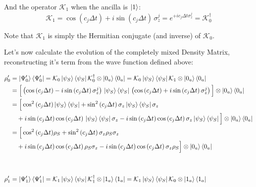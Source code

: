 \documentclass[a4paper,12pt]{article}
\begin{document}
	And the operator $\mathcal{K}_1$ when the ancilla is $\ket{1}$:
	\begin{equation}
		\mathcal{K}_1 = \cos{\left( c_j \Delta t \right)} + i \sin{\left( c_j \Delta t \right)} \, \sigma_{z}^{j} = e^{+i c_j \Delta t \sigma_z^j} = \mathcal{K}_0^\dagger
		\label{eq:k1_def}
	\end{equation}

	Note that $\mathcal{K}_1$ is simply the Hermitian conjugate (and inverse) of $\mathcal{K}_0$.

	\begin{flushleft}
		Let's now calculate the evolution of the completely mixed Density Matrix, reconstructing it's term from the wave function defined above:
	\end{flushleft}
	\begin{align}
		\rho'_{0} &= \ket{\Psi'_{0}}\bra{\Psi'_{0}} = \mathcal{K}_{0} \ket{\psi_S}\bra{\psi_S} \mathcal{K}_{0}^{\dagger} \otimes \ket{0_a}\bra{0_a} = \mathcal{K}_{0} \ket{\psi_S}\bra{\psi_S} \mathcal{K}_{1} \otimes \ket{0_a}\bra{0_a} \notag \\
		& = \Big [ \left(\cos{\left( c_j \Delta t \right)} - i \sin{\left( c_j \Delta t \right)} \, \sigma_{z}^{j}\right) \, \ket{\psi_S}\bra{\psi_S} \, \left(\cos{\left( c_j \Delta t \right)} + i \sin{\left( c_j \Delta t \right)} \, \sigma_{z}^{j}\right) \Big]    \otimes \ket{0_a}\bra{0_a} \notag \\
		&= \Big [ \cos^{2}{\left(c_{j} \Delta t\right)} \ket{\psi_S}\bra{\psi_S} + \sin^{2}{\left(c_{j} \Delta t\right)} \, \sigma_{z} \ket{\psi_S}\bra{\psi_S} \sigma_{z} \notag  \\
		& \quad + i \sin{\left(c_{j} \Delta t \right)} \cos{\left(c_{j} \Delta t\right)} \,  \ket{\psi_S}\bra{\psi_S} \sigma_{z} -i \sin{\left(c_{j} \Delta t \right)} \cos{\left(c_{j} \Delta t\right)} \, \sigma_{z} \ket{\psi_S}\bra{\psi_S} \Big] \otimes \ket{0_a}\bra{0_a} \notag \\
		&= \Big [ \cos^{2}{\left(c_{j} \Delta t\right)} \rho_S + \sin^{2}{\left(c_{j} \Delta t\right)} \, \sigma_{z} \rho_S \sigma_{z} \notag \\
		& \quad + i \sin{\left(c_{j} \Delta t \right)} \cos{\left(c_{j} \Delta t\right)} \, \rho_S \sigma_{z} - i \sin{\left(c_{j} \Delta t \right)} \cos{\left(c_{j} \Delta t\right)} \, \sigma_{z} \rho_S \Big] \otimes \ket{0_a}\bra{0_a} \\
		\notag \\
		\notag \\
		\rho'_{1} &= \ket{\Psi'_{1}}\bra{\Psi'_{1}} = \mathcal{K}_{1} \ket{\psi_S}\bra{\psi_S} \mathcal{K}_{1}^{\dagger} \otimes \ket{1_a}\bra{1_a} = \mathcal{K}_{1} \ket{\psi_S}\bra{\psi_S} \mathcal{K}_{0} \otimes \ket{1_a}\bra{1_a} \notag \\

\end{align}
\end{document}
